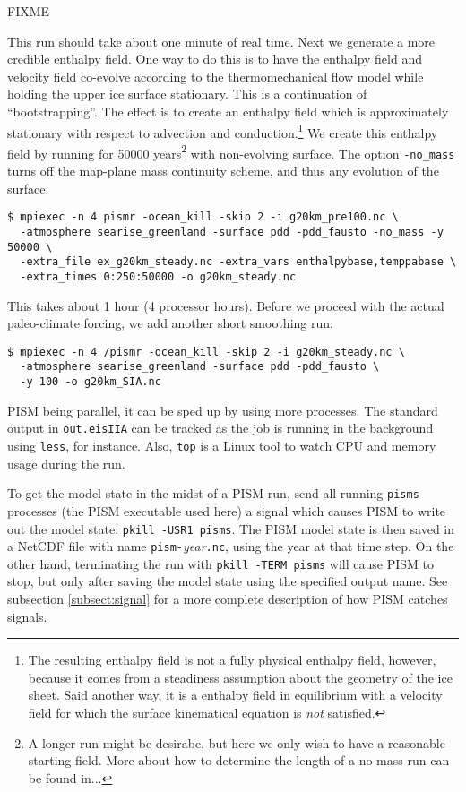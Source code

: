FIXME 

\noindent This run should take about one minute of real time. Next we generate a more credible enthalpy field. One way to do this is to have the enthalpy field and velocity field co-evolve according to the thermomechanical flow model while holding the upper ice surface stationary.  This is a continuation of ``bootstrapping''.  The effect is to create an enthalpy field which is approximately stationary with respect to advection and conduction.\footnote{The resulting enthalpy field is not a fully physical enthalpy field, however, because it comes from a steadiness assumption about the geometry of the ice sheet.  Said another way, it is a enthalpy field in equilibrium with a velocity field for which the surface kinematical equation \cite{Fowler} is \emph{not} satisfied.}  We create this enthalpy field by running for 50000 years\footnote{A longer run might be desirabe, but here we only wish to have a reasonable starting field. More about how to determine the length of a no-mass run can be found in...} with non-evolving surface.  The option \verb|-no_mass| turns off the map-plane mass continuity scheme, and thus any evolution of the surface.
\begin{verbatim}
$ mpiexec -n 4 pismr -ocean_kill -skip 2 -i g20km_pre100.nc \
  -atmosphere searise_greenland -surface pdd -pdd_fausto -no_mass -y 50000 \ 
  -extra_file ex_g20km_steady.nc -extra_vars enthalpybase,temppabase \ 
  -extra_times 0:250:50000 -o g20km_steady.nc
\end{verbatim} This takes about 1 hour (4 processor hours). Before we proceed with the actual paleo-climate forcing, we add another short smoothing run:
\begin{verbatim}
$ mpiexec -n 4 /pismr -ocean_kill -skip 2 -i g20km_steady.nc \
  -atmosphere searise_greenland -surface pdd -pdd_fausto \
  -y 100 -o g20km_SIA.nc
\end{verbatim}







PISM being parallel, it can be sped up by using more processes.  The standard output in \verb|out.eisIIA| can be tracked as the job is running in the background using \verb|less|, for instance.  Also, \verb|top| is a Linux tool to watch CPU and memory usage during the run.


To get the model state in the midst of a PISM run, send all running \verb|pisms| processes (the PISM executable used here) a signal which causes PISM to write out the model state: \verb|pkill -USR1 pisms|.  The PISM model state is then saved in a NetCDF file with name \verb|pism-|\emph{year}\verb|.nc|, using the year at that time step.  On the other hand, terminating the run with \verb|pkill -TERM pisms| will cause PISM to stop, but only after saving the model state using the specified output name.  See subsection \ref{subsect:signal} for a more complete description of how PISM catches signals.

